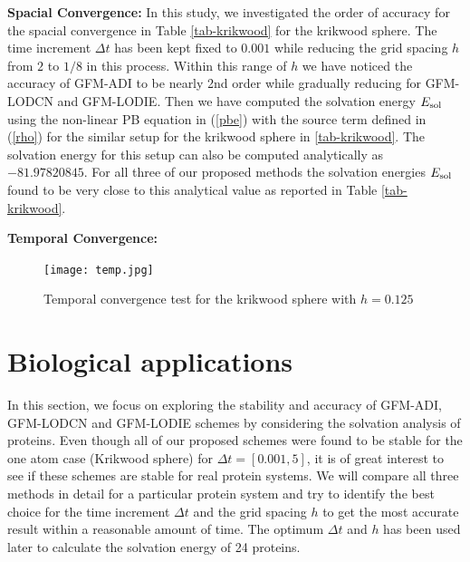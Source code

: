 \textbf{Spacial Convergence:}  In this study, we investigated the order of  accuracy for the spacial convergence in Table \ref{tab-krikwood} for the krikwood sphere. The time increment $\Delta t$ has been kept fixed to $0.001$ while reducing the grid spacing $h$ from $2$ to $1/8$ in this process. Within this range of $h$ we have noticed the accuracy of GFM-ADI to be nearly 2nd order while gradually reducing for GFM-LODCN and GFM-LODIE. Then we have computed the solvation energy $E_{\rm sol}$ using the non-linear PB equation in (\ref{pbe}) with the source term defined in (\ref{rho}) for the similar setup for the krikwood sphere in \ref{tab-krikwood}. The solvation energy for this setup can also be computed analytically as $-81.97820845$. For all three of our proposed methods the solvation energies $E_{\rm sol}$ found to be very close to this analytical value as reported in Table \ref{tab-krikwood}. 

\textbf{Temporal Convergence:}

\begin{figure}[!ht]
	\centering
	\texttt{[image: temp.jpg]}
	\caption{Temporal convergence test for the krikwood sphere with $h=0.125$}

\end{figure}


   
\section{Biological applications}

In this section, we focus on exploring the stability and accuracy of GFM-ADI, GFM-LODCN and GFM-LODIE schemes by considering the solvation analysis of proteins. Even though all of our proposed schemes were found to be stable for the one atom case (Krikwood sphere) for $\Delta t =[0.001,5]$, it is of great interest to see if these schemes are stable for real protein systems. We will compare all three methods in detail for a particular protein system and try to identify the best choice for the time increment $\Delta t $ and the grid spacing $h$ to get the most accurate result within a reasonable amount of time. The optimum $\Delta t$ and $h$ has been used later to calculate the solvation energy of 24 proteins.      

